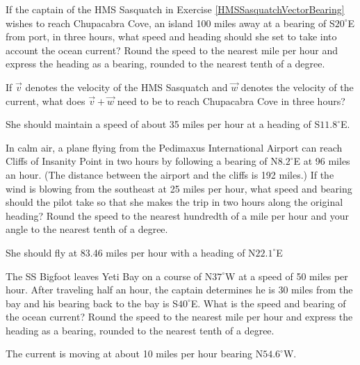 \documentclass{ximera}
\begin{document}
\begin{problem}
If the captain of the HMS Sasquatch in Exercise \ref{HMSSasquatchVectorBearing} wishes to reach Chupacabra Cove, an island 100 miles away at a bearing of  S$20^{\circ}$E from port, in three hours, what speed and heading should she set to take into account the ocean current?   Round the speed to the nearest mile per hour and express the heading as a bearing, rounded to the nearest tenth of a degree.  

\begin{hint}
If $\overrightarrow{v}$ denotes the velocity of the HMS Sasquatch and $\overrightarrow{w}$ denotes the velocity of the current, what does $\overrightarrow{v} + \overrightarrow{w}$ need to be to reach Chupacabra Cove in three hours?    
\end{hint}

\begin{solution}
She should maintain a speed of about 35 miles per hour at a heading of S$11.8^{\circ}$E.
\end{solution}

\end{problem}

\begin{problem}
In calm air, a plane flying from the Pedimaxus International Airport can reach Cliffs of Insanity Point in two hours by following a bearing of N$8.2^{\circ}$E at 96 miles an hour.  (The distance between the airport and the cliffs is 192 miles.)  If the wind is blowing from the southeast at 25 miles per hour, what speed and bearing should the pilot take so that she makes the trip in two hours along the original heading?  Round the speed to the nearest hundredth of a mile per hour and your angle to the nearest tenth of a degree.

\begin{solution}
She should fly at 83.46 miles per hour with a heading of N$22.1^{\circ}$E
\end{solution}
\end{problem}

\begin{problem}
The SS Bigfoot leaves Yeti Bay on a course of N$37^{\circ}$W at a speed of 50 miles per hour.  After traveling half an hour, the captain determines he is 30 miles from the bay and his bearing back to the bay is S$40^{\circ}$E.  What is the speed and bearing of the ocean current?  Round the speed to the nearest mile per hour and express the heading as a bearing, rounded to the nearest tenth of a degree. 

\begin{solution}
The current is moving at about 10 miles per hour bearing N$54.6^{\circ}$W.
\end{solution}
\end{problem}
\end{document}
